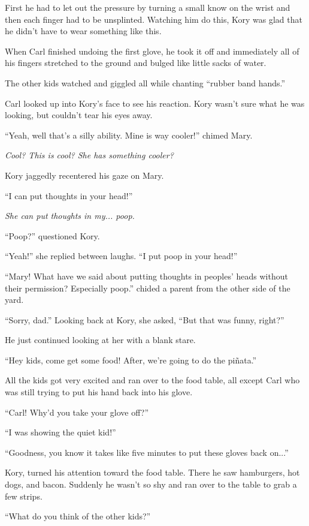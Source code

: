 First he had to let out the pressure by turning a small know on the wrist and then each finger had to be unsplinted. Watching him do this, Kory was glad that he didn't have to wear something like this.

When Carl finished undoing the first glove, he took it off and immediately all of his fingers stretched to the ground and bulged like little sacks of water.

The other kids watched and giggled all while chanting ``rubber band hands.''

Carl looked up into Kory's face to see his reaction. Kory wasn't sure what he was looking, but couldn't tear his eyes away.

``Yeah, well that's a silly ability. Mine is way cooler!'' chimed Mary.

\textit{Cool? This is cool? She has something cooler?}

Kory jaggedly recentered his gaze on Mary.

``I can put thoughts in your head!''

\textit{She can put thoughts in my... poop.}

``Poop?'' questioned Kory.

``Yeah!'' she replied between laughs. ``I put poop in your head!''

``Mary! What have we said about putting thoughts in peoples' heads without their permission? Especially poop.'' chided a parent from the other side of the yard.

``Sorry, dad.'' Looking back at Kory, she asked, ``But that was funny, right?''

He just continued looking at her with a blank stare.

``Hey kids, come get some food! After, we're going to do the piñata.''

All the kids got very excited and ran over to the food table, all except Carl who was still trying to put his hand back into his glove.

``Carl! Why'd you take your glove off?''

``I was showing the quiet kid!''

``Goodness, you know it takes like five minutes to put these gloves back on...''

Kory, turned his attention toward the food table. There he saw hamburgers, hot dogs, and bacon. Suddenly he wasn't so shy and ran over to the table to grab a few strips.

``What do you think of the other kids?''

